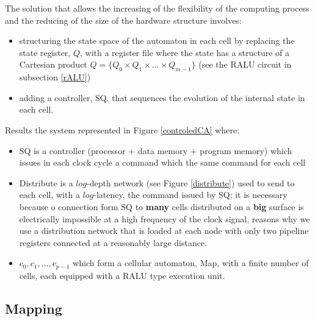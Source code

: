 The solution that allows the increasing of the flexibility of the computing process and the reducing of the size of the hardware structure involves:
\begin{itemize}
    \item structuring the state space of the automaton in each cell by replacing the state register, $Q$, with a register file where the state has a structure of a Cartesian product $Q = \{Q_0 \times  Q_1 \times \ldots \times Q_{m-1}\}$ (see the RALU circuit in subsection \ref{rALU})
    \item adding a controller, SQ, that sequences the evolution of the internal state in each cell. 
\end{itemize}
Results the system represented in Figure \ref{controledCA} where:
\begin{itemize}
    \item SQ is a controller (processor + data memory + program memory) which issues in each clock cycle a command which the same command for each cell
    \item Distribute is a $log$-depth network (see Figure \ref{distribute}) used to send to each cell, with a $log$-latency, the command issued by SQ; it is necessary because o connection form SQ to {\bf many} cells distributed on a {\bf big} surface is electrically impossible at a high frequency of the clock signal, reasons why we use a distribution network that is loaded at each node with only two pipeline registers connected at a reasonably large distance.

    
    \item $c_0, c_1, \ldots, c_{p-1}$ which form a cellular automaton, Map, with a finite number of cells, each equipped with a RALU type execution unit.
\end{itemize}

\subsection{Mapping}

